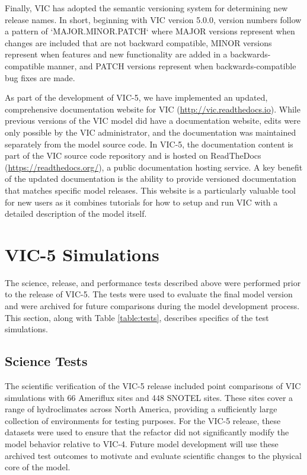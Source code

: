 \documentclass[gmd, manuscript]{copernicus}
\begin{document}
    Finally, VIC has adopted the semantic versioning system \citep{Preston-Werner_2018} for determining new release names. In short, beginning with VIC version 5.0.0, version numbers follow a pattern of `MAJOR.MINOR.PATCH` where MAJOR versions represent when changes are included that are not backward compatible, MINOR versions represent when features and new functionality are added in a backwards-compatible manner, and PATCH versions represent when backwards-compatible bug fixes are made.

    As part of the development of VIC-5, we have implemented an updated, comprehensive documentation website for VIC (\url{http://vic.readthedocs.io}). While previous versions of the VIC model did have a documentation website, edits were only possible by the VIC administrator, and the documentation was maintained separately from the model source code. In VIC-5, the documentation content is part of the VIC source code repository and is hosted on ReadTheDocs (\url{https://readthedocs.org/}), a public documentation hosting service. A key benefit of the updated documentation is the ability to provide versioned documentation that matches specific model releases. This website is a particularly valuable tool for new users as it combines tutorials for how to setup and run VIC with a detailed description of the model itself.


  \section{VIC-5 Simulations}
    \label{sec:vic-5_simulations}

    The science, release, and performance tests described above were performed prior to the release of VIC-5. The tests were used to evaluate the final model version and were archived for future comparisons during the model development process. This section, along with Table \ref{table:tests}, describes specifics of the test simulations.

    \subsection{Science Tests}
    \label{sec:science_sims}

    The scientific verification of the VIC-5 release included point comparisons of VIC simulations with 66 Ameriflux sites \citep{Baldocchi_1996,Baldocchi_2001,Bohn_2016} and 448 SNOTEL sites. These sites cover a range of hydroclimates across North America, providing a sufficiently large collection of environments for testing purposes. For the VIC-5 release, these datasets were used to ensure that the refactor did not significantly modify the model behavior relative to VIC-4. Future model development will use these archived test outcomes to motivate and evaluate scientific changes to the physical core of the model.
\end{document}

